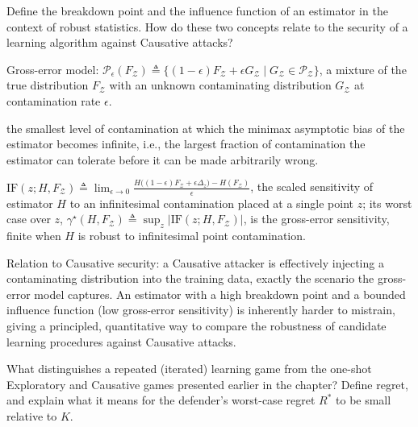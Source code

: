 \documentclass[10pt]{extarticle}
\newcommand{\resposta}[1]{\par\smallskip\noindent #1}
\begin{document}
\begin{questoes}
\item Define the breakdown point and the influence function of an estimator in the context of robust statistics. How do these two concepts relate to the security of a learning algorithm against Causative attacks?

\resposta{
\begin{topicos}
\item Gross-error model: $\mathcal{P}_\epsilon(F_{\mathcal{Z}}) \triangleq \{(1-\epsilon)F_{\mathcal{Z}} + \epsilon G_{\mathcal{Z}} \mid G_{\mathcal{Z}} \in \mathcal{P}_{\mathcal{Z}}\}$, a mixture of the true distribution $F_{\mathcal{Z}}$ with an unknown contaminating distribution $G_{\mathcal{Z}}$ at contamination rate $\epsilon$.
\item[Breakdown point $\epsilon^\star$:] the smallest level of contamination at which the minimax asymptotic bias of the estimator becomes infinite, i.e., the largest fraction of contamination the estimator can tolerate before it can be made arbitrarily wrong.
\item[Influence function:] $\displaystyle \mathrm{IF}(z; H, F_{\mathcal{Z}}) \triangleq \lim_{\epsilon\to 0} \frac{H\big((1-\epsilon)F_{\mathcal{Z}} + \epsilon \Delta_z\big) - H(F_{\mathcal{Z}})}{\epsilon}$, the scaled sensitivity of estimator $H$ to an infinitesimal contamination placed at a single point $z$; its worst case over $z$, $\gamma^\star(H, F_{\mathcal{Z}}) \triangleq \sup_z |\mathrm{IF}(z; H, F_{\mathcal{Z}})|$, is the gross-error sensitivity, finite when $H$ is robust to infinitesimal point contamination.
\item Relation to Causative security: a Causative attacker is effectively injecting a contaminating distribution into the training data, exactly the scenario the gross-error model captures. An estimator with a high breakdown point and a bounded influence function (low gross-error sensitivity) is inherently harder to mistrain, giving a principled, quantitative way to compare the robustness of candidate learning procedures against Causative attacks.
\end{topicos}
}

\item What distinguishes a repeated (iterated) learning game from the one-shot Exploratory and Causative games presented earlier in the chapter? Define regret, and explain what it means for the defender's worst-case regret $R^*$ to be small relative to $K$.


\end{questoes}
\end{document}

